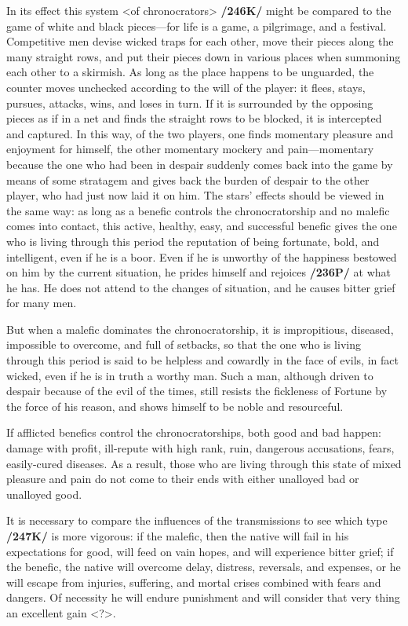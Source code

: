 In its effect this system <of chronocrators> \textbf{/246K/} might be compared to the game of white and black pieces—for life is a game, a pilgrimage, and a festival. Competitive men devise wicked traps for each other, move their pieces along the many straight rows, and put their pieces down in various places when summoning each other to a skirmish. As long as the place happens to be unguarded, the counter moves unchecked according to the will of the player: it flees, stays, pursues, attacks, wins, and loses in turn. If it is surrounded by the opposing pieces as if in a net and finds the straight rows to be blocked, it is intercepted and captured. In this way, of the two players, one finds momentary pleasure and enjoyment for himself, the other momentary mockery and pain—momentary because the one who had been in despair suddenly comes back into the game by means of some stratagem and gives back the burden of despair to the other player, who had just now laid it on him. The stars’ effects should be viewed in the same way: as long as a benefic controls the chronocratorship
and no malefic comes into contact, this active, healthy, easy, and successful benefic gives the one who is living through this period the reputation of being fortunate, bold, and intelligent, even if he is a boor.
Even if he is unworthy of the happiness bestowed on him by the current situation, he prides himself and rejoices \textbf{/236P/} at what he has. He does not attend to the changes of situation, and he causes bitter grief for many men. 

But when a malefic dominates the chronocratorship, it is impropitious, diseased, impossible to overcome, and full of setbacks, so that the one who is living through this period is said to be helpless and cowardly in the face of evils, in fact wicked, even if he is in truth a worthy man. Such a man, although driven to despair because of the evil of the times, still resists the fickleness of Fortune by the force of his
reason, and shows himself to be noble and resourceful. 

If \mnbm afflicted benefics control the chronocratorships, both good and bad happen: damage with profit, ill-repute with high rank, ruin, dangerous accusations, fears, easily-cured diseases. As a result, those who are living through this state of mixed pleasure and pain do not come to their ends with either unalloyed bad or unalloyed good.

It is necessary to compare the influences of the transmissions to see which type \textbf{/247K/} is more vigorous: if the malefic, then the native will fail in his expectations for good, will feed on vain hopes, and
will experience bitter grief; if the benefic, the native will overcome delay, distress, reversals, and expenses, or he will escape from injuries, suffering, and mortal crises combined with fears and dangers. Of necessity he will endure punishment and will consider that very thing an excellent gain <?>. 

